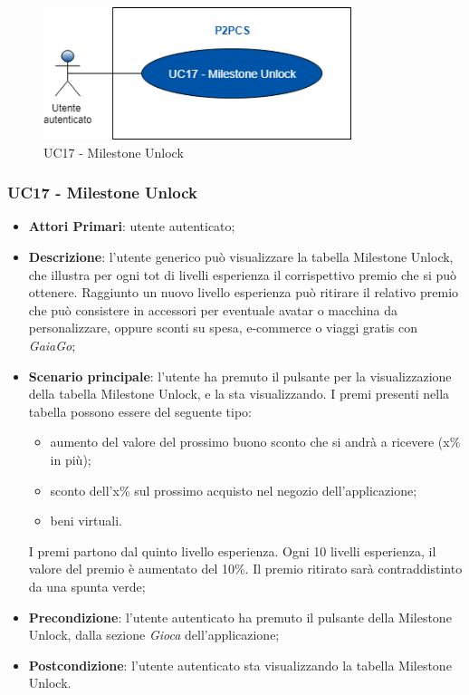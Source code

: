 \begin{figure}[h]
	\includegraphics[width=9cm]{res/images/uc20-21.png}
	\centering
	\caption{UC17 - Milestone Unlock}
\end{figure}
\subsubsection{UC17 - Milestone Unlock}
\begin{itemize}
	\item \textbf{Attori Primari}: utente autenticato;
	\item \textbf{Descrizione}: l'utente generico può visualizzare la tabella Milestone Unlock\glo, che illustra per ogni tot di livelli esperienza il corrispettivo premio che si può ottenere. Raggiunto un nuovo livello esperienza può ritirare il relativo premio che può consistere in accessori per eventuale avatar o macchina da personalizzare, oppure sconti su spesa, e-commerce o viaggi gratis con \textit{GaiaGo};	
	\item \textbf{Scenario principale}: l'utente ha premuto il pulsante per la visualizzazione della tabella Milestone Unlock, e la sta visualizzando.
	I premi presenti nella tabella possono essere del seguente tipo:
	\begin{itemize}
		\item aumento del valore del prossimo buono sconto che si andrà a ricevere (x\% in più);
		\item sconto dell'x\% sul prossimo acquisto nel negozio dell'applicazione;
		\item beni virtuali.
	\end{itemize}
	I premi partono dal quinto livello esperienza.
	Ogni 10 livelli esperienza, il valore del premio è aumentato del 10\%.
	Il premio ritirato sarà contraddistinto da una spunta verde;
	\item \textbf{Precondizione}: l'utente autenticato ha premuto il pulsante della Milestone Unlock, dalla sezione \textit{Gioca} dell'applicazione;
	\item \textbf{Postcondizione}: l'utente autenticato sta visualizzando la tabella Milestone Unlock.
\end{itemize}
